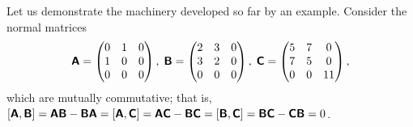 {\color{blue}
\bexample
Let us demonstrate the machinery developed so far by an example.
Consider the normal matrices
$$
\textsf{\textbf{A}} = %
\begin{pmatrix}
0& 1& 0\\ 1& 0& 0\\ 0& 0& 0
\end{pmatrix},\;
\textsf{\textbf{B}} = %
\begin{pmatrix}
2& 3& 0\\ 3& 2& 0\\ 0& 0& 0
\end{pmatrix},\;
\textsf{\textbf{C}} = %
\begin{pmatrix}
5& 7& 0\\ 7& 5& 0\\ 0& 0& 11
\end{pmatrix},
$$
which are mutually commutative; that is,
$
[\textsf{\textbf{A}}, \textsf{\textbf{B}}]=
\textsf{\textbf{A}} \textsf{\textbf{B}}-\textsf{\textbf{B}}\textsf{\textbf{A}}=
[\textsf{\textbf{A}}, \textsf{\textbf{C}}]=
\textsf{\textbf{A}} \textsf{\textbf{C}}-\textsf{\textbf{B}}\textsf{\textbf{C}}=
[\textsf{\textbf{B}}, \textsf{\textbf{C}}]=
\textsf{\textbf{B}} \textsf{\textbf{C}}-\textsf{\textbf{C}}\textsf{\textbf{B}}=0$.

}
